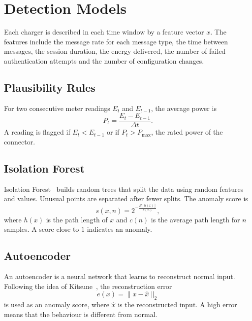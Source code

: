 \documentclass[runningheads]{llncs}
\begin{document}
\section{Detection Models}\label{sec:models}
Each charger is described in each time window by a feature vector $x$. The features include the message rate for each message type, the time between messages, the session duration, the energy delivered, the number of failed authentication attempts and the number of configuration changes.

\subsection{Plausibility Rules}
For two consecutive meter readings $E_t$ and $E_{t-1}$, the average power is
\begin{equation}
P_t = \frac{E_t - E_{t-1}}{\Delta t}.
\end{equation}
A reading is flagged if $E_t < E_{t-1}$ or if $P_t > P_{\max}$, the rated power of the connector.

\subsection{Isolation Forest}
Isolation Forest~\cite{liu2008isolation} builds random trees that split the data using random features and values. Unusual points are separated after fewer splits. The anomaly score is
\begin{equation}
s(x, n) = 2^{-\frac{E[h(x)]}{c(n)}},
\end{equation}
where $h(x)$ is the path length of $x$ and $c(n)$ is the average path length for $n$ samples. A score close to $1$ indicates an anomaly.

\subsection{Autoencoder}
An autoencoder is a neural network that learns to reconstruct normal input. Following the idea of Kitsune~\cite{mirsky2018kitsune}, the reconstruction error
\begin{equation}
e(x) = \lVert x - \hat{x} \rVert_2
\end{equation}
is used as an anomaly score, where $\hat{x}$ is the reconstructed input. A high error means that the behaviour is different from normal.
\end{document}
